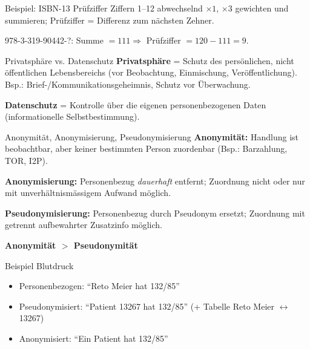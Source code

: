 \documentclass[a4paper, fontsize=7pt]{scrartcl}
\begin{document}
\begin{subbox}{Beispiel: ISBN-13 Prüfziffer}
Ziffern 1--12 abwechselnd $\times 1$, $\times 3$ gewichten und summieren; Prüfziffer
= Differenz zum nächsten Zehner.

978-3-319-90442-?: Summe $= 111 \Rightarrow$ Prüfziffer $= 120 - 111 = 9$.
\end{subbox}

\begin{mainbox}{Privatsphäre vs. Datenschutz}
\textbf{Privatsphäre} = Schutz des persönlichen, nicht öffentlichen Lebensbereichs
(vor Beobachtung, Einmischung, Veröffentlichung). Bsp.: Brief-/Kommunikationsgeheimnis,
Schutz vor Überwachung.

\textbf{Datenschutz} = Kontrolle über die eigenen personenbezogenen Daten
(informationelle Selbstbestimmung).
\end{mainbox}

\begin{mainbox}{Anonymität, Anonymisierung, Pseudonymisierung}
\textbf{Anonymität:} Handlung ist beobachtbar, aber keiner bestimmten Person
zuordenbar (Bsp.: Barzahlung, TOR, I2P).

\textbf{Anonymisierung:} Personenbezug \emph{dauerhaft} entfernt; Zuordnung nicht
oder nur mit unverhältnismässigem Aufwand möglich.

\textbf{Pseudonymisierung:} Personenbezug durch Pseudonym ersetzt; Zuordnung mit
getrennt aufbewahrter Zusatzinfo möglich.

\textbf{Anonymität $>$ Pseudonymität}
\end{mainbox}

\begin{subbox}{Beispiel Blutdruck}
\begin{itemize}
    \item Personenbezogen: ``Reto Meier hat 132/85''
    \item Pseudonymisiert: ``Patient 13267 hat 132/85'' (+ Tabelle
          Reto Meier $\leftrightarrow$ 13267)
    \item Anonymisiert: ``Ein Patient hat 132/85''
\end{itemize}
\end{subbox}
\end{document}
